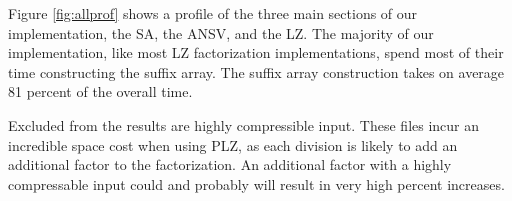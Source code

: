 Figure \ref{fig:allprof} shows a profile of the three main sections of our implementation, the SA, the ANSV, and the LZ.
The majority of our implementation, like most LZ factorization implementations, spend most of their time constructing the suffix array.
The suffix array construction takes on average 81 percent of the overall time.

Excluded from the results are highly compressible input.
These files incur an incredible space cost when using PLZ, as each division is likely to add an additional factor to the factorization.
An additional factor with a highly compressable input could and probably will result in very high percent increases.
